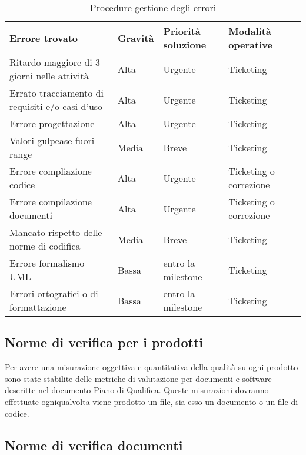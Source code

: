 \documentclass{scalatekids-article}
\begin{document}
\begin{table}[H]
  \centering
  \begin{tabular}{| l | l | l | l | p{5cm} |}
    \hline
    \textbf{Errore trovato} & \textbf{Gravità} & \textbf{Priorità soluzione} & \textbf{Modalità operative} \\
    \hline
    Ritardo maggiore di 3 giorni nelle attività & Alta & Urgente & Ticketing \\
    \hline
    Errato tracciamento di requisiti e/o casi d'uso & Alta & Urgente & Ticketing \\
    \hline
    Errore progettazione & Alta & Urgente & Ticketing \\
    \hline
    Valori gulpease fuori range & Media & Breve & Ticketing \\
    \hline
    Errore compliazione codice & Alta & Urgente & Ticketing o correzione\\
    \hline
    Errore compilazione documenti & Alta & Urgente & Ticketing o correzione \\
    \hline
    Mancato rispetto delle norme di codifica & Media & Breve & Ticketing \\
    \hline
    Errore formalismo UML & Bassa & entro la milestone & Ticketing \\
    \hline
    Errori ortografici o di formattazione & Bassa & entro la milestone & Ticketing \\
    \hline
  \end{tabular}
  \caption{Procedure gestione degli errori}
\end{table}

\subsection{Norme di verifica per i prodotti}

Per avere una misurazione oggettiva e quantitativa della qualità su ogni prodotto sono state stabilite delle metriche di valutazione per documenti e software descritte nel documento \href{run:../Esterni/PianoDiQualifica\_v3.0.0.pdf}{Piano di Qualifica}. Queste misurazioni dovranno effettuate ogniqualvolta viene prodotto un file, sia esso un documento o un file di codice.\\

\subsection{Norme di verifica documenti}

\label{sec:VerificaDocumenti}
\end{document}
